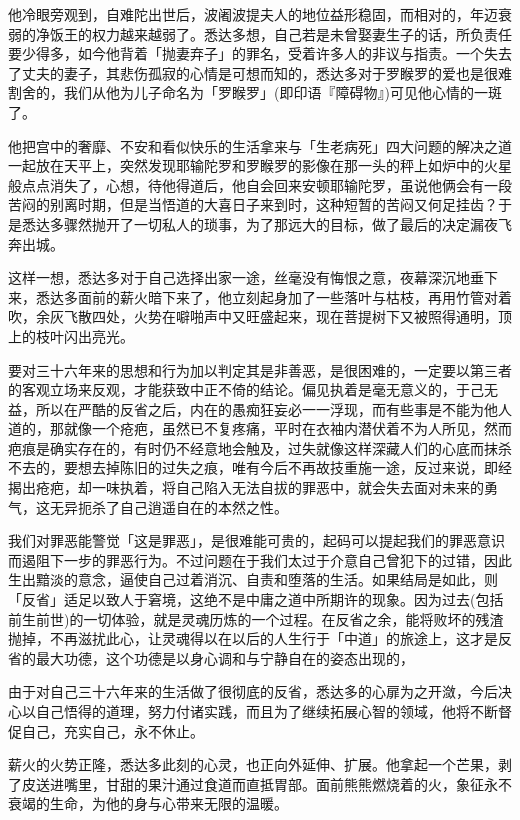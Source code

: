 \documentclass[12pt,twoside,openany]{book}
\begin{document}
他冷眼旁观到，自难陀出世后，波阇波提夫人的地位益形稳固，而相对的，年迈衰弱的净饭王的权力越来越弱了。悉达多想，自己若是未曾娶妻生子的话，所负责任要少得多，如今他背着「抛妻弃子」的罪名，受着许多人的非议与指责。一个失去了丈夫的妻子，其悲伤孤寂的心情是可想而知的，悉达多对于罗睺罗的爱也是很难割舍的，我们从他为儿子命名为「罗睺罗」(即印语『障碍物』)可见他心情的一斑了。

他把宫中的奢靡、不安和看似快乐的生活拿来与「生老病死」四大问题的解决之道一起放在天平上，突然发现耶输陀罗和罗睺罗的影像在那一头的秤上如炉中的火星般点点消失了，心想，待他得道后，他自会回来安顿耶输陀罗，虽说他俩会有一段苦闷的别离时期，但是当悟道的大喜日子来到时，这种短暂的苦闷又何足挂齿？于是悉达多骤然抛开了一切私人的琐事，为了那远大的目标，做了最后的决定漏夜飞奔出城。

这样一想，悉达多对于自己选择出家一途，丝毫没有悔恨之意，夜幕深沉地垂下来，悉达多面前的薪火暗下来了，他立刻起身加了一些落叶与枯枝，再用竹管对着吹，余灰飞散四处，火势在噼啪声中又旺盛起来，现在菩提树下又被照得通明，顶上的枝叶闪出亮光。

要对三十六年来的思想和行为加以判定其是非善恶，是很困难的，一定要以第三者的客观立场来反观，才能获致中正不倚的结论。偏见执着是毫无意义的，于己无益，所以在严酷的反省之后，内在的愚痴狂妄必一一浮现，而有些事是不能为他人道的，那就像一个疮疤，虽然已不复疼痛，平时在衣袖内潜伏着不为人所见，然而疤痕是确实存在的，有时仍不经意地会触及，过失就像这样深藏人们的心底而抹杀不去的，要想去掉陈旧的过失之痕，唯有今后不再故技重施一途，反过来说，即经揭出疮疤，却一味执着，将自己陷入无法自拔的罪恶中，就会失去面对未来的勇气，这无异扼杀了自己逍遥自在的本然之性。

我们对罪恶能警觉「这是罪恶」，是很难能可贵的，起码可以提起我们的罪恶意识而遏阻下一步的罪恶行为。不过问题在于我们太过于介意自己曾犯下的过错，因此生出黯淡的意念，逼使自己过着消沉、自责和堕落的生活。如果结局是如此，则「反省」适足以致人于窘境，这绝不是中庸之道中所期许的现象。因为过去(包括前生前世)的一切体验，就是灵魂历炼的一个过程。在反省之余，能将败坏的残渣抛掉，不再滋扰此心，让灵魂得以在以后的人生行于「中道」的旅途上，这才是反省的最大功德，这个功德是以身心调和与宁静自在的姿态出现的，



由于对自己三十六年来的生活做了很彻底的反省，悉达多的心扉为之开潋，今后决心以自己悟得的道理，努力付诸实践，而且为了继续拓展心智的领域，他将不断督促自己，充实自己，永不休止。

薪火的火势正隆，悉达多此刻的心灵，也正向外延伸、扩展。他拿起一个芒果，剥了皮送进嘴里，甘甜的果汁通过食道而直抵胃部。面前熊熊燃烧着的火，象征永不衰竭的生命，为他的身与心带来无限的温暖。
\end{document}
